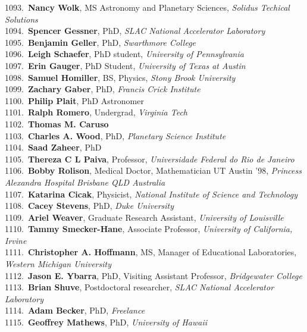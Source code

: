 1093.~{\bf Nancy Wolk}, MS Astronomy and Planetary Sciences, {\sl Solidus Techical Solutions} \\
1094.~{\bf Spencer Gessner}, PhD, {\sl SLAC National Accelerator Laboratory} \\
1095.~{\bf Benjamin Geller}, PhD, {\sl Swarthmore College} \\
1096.~{\bf Leigh Schaefer}, PhD student, {\sl University of Pennsylvania} \\
1097.~{\bf Erin Gauger}, PhD Student, {\sl University of Texas at Austin} \\
1098.~{\bf Samuel Homiller}, BS, Physics, {\sl Stony Brook University} \\
1099.~{\bf Zachary Gaber}, PhD, {\sl Francis Crick Institute} \\
1100.~{\bf Philip Plait}, PhD Astronomer \\
1101.~{\bf Ralph Romero}, Undergrad, {\sl Virginia Tech} \\
1102.~{\bf Thomas M. Caruso} \\
1103.~{\bf Charles A. Wood}, PhD, {\sl Planetary Science Institute} \\
1104.~{\bf Saad Zaheer}, PhD \\
1105.~{\bf Thereza C L Paiva}, Professor, {\sl Universidade Federal do Rio de Janeiro } \\
1106.~{\bf Bobby Rolison}, Medical Doctor, Mathematician UT Austin '98, {\sl Princess Alexandra Hospital Brisbane QLD Australia} \\
1107.~{\bf Katarina Cicak}, Physicist, {\sl National Institute of Science and Technology} \\
1108.~{\bf Cacey Stevens}, PhD, {\sl Duke University} \\
1109.~{\bf Ariel Weaver}, Graduate Research Assistant, {\sl University of Louisville} \\
1110.~{\bf Tammy Smecker-Hane}, Associate Professor, {\sl University of California, Irvine} \\
1111.~{\bf Christopher A. Hoffmann}, MS, Manager of Educational Laboratories, {\sl Western Michigan University} \\
1112.~{\bf Jason E. Ybarra}, PhD, Visiting Assistant Professor, {\sl Bridgewater College} \\
1113.~{\bf Brian Shuve}, Postdoctoral researcher, {\sl SLAC National Accelerator Laboratory} \\
1114.~{\bf Adam Becker}, PhD, {\sl Freelance} \\
1115.~{\bf Geoffrey Mathews}, PhD, {\sl University of Hawaii} \\
